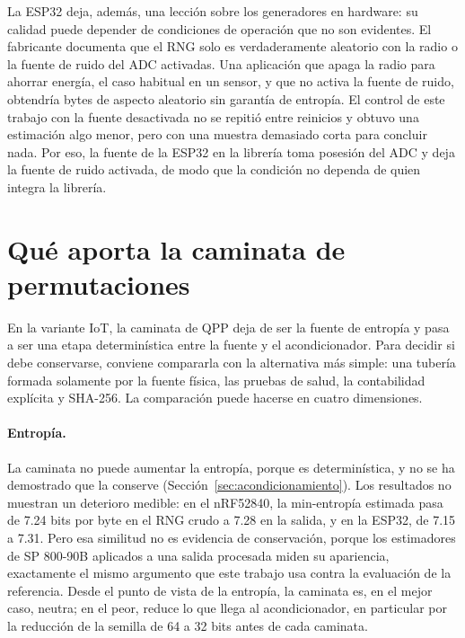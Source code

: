 La ESP32 deja, además, una lección sobre los generadores en hardware: su calidad puede depender de condiciones de operación que no son evidentes. El fabricante documenta que el RNG solo es verdaderamente aleatorio con la radio o la fuente de ruido del ADC activadas. Una aplicación que apaga la radio para ahorrar energía, el caso habitual en un sensor, y que no activa la fuente de ruido, obtendría bytes de aspecto aleatorio sin garantía de entropía. El control de este trabajo con la fuente desactivada no se repitió entre reinicios y obtuvo una estimación algo menor, pero con una muestra demasiado corta para concluir nada. Por eso, la fuente de la ESP32 en la librería toma posesión del ADC y deja la fuente de ruido activada, de modo que la condición no dependa de quien integra la librería.

\section{Qué aporta la caminata de permutaciones}
\label{sec:aporte_caminata}

En la variante IoT, la caminata de QPP deja de ser la fuente de entropía y pasa a ser una etapa determinística entre la fuente y el acondicionador. Para decidir si debe conservarse, conviene compararla con la alternativa más simple: una tubería formada solamente por la fuente física, las pruebas de salud, la contabilidad explícita y SHA-256. La comparación puede hacerse en cuatro dimensiones.

\paragraph{Entropía.} La caminata no puede aumentar la entropía, porque es determinística, y no se ha demostrado que la conserve (Sección~\ref{sec:acondicionamiento}). Los resultados no muestran un deterioro medible: en el nRF52840, la min-entropía estimada pasa de 7.24 bits por byte en el RNG crudo a 7.28 en la salida, y en la ESP32, de 7.15 a 7.31. Pero esa similitud no es evidencia de conservación, porque los estimadores de SP 800-90B aplicados a una salida procesada miden su apariencia, exactamente el mismo argumento que este trabajo usa contra la evaluación de la referencia. Desde el punto de vista de la entropía, la caminata es, en el mejor caso, neutra; en el peor, reduce lo que llega al acondicionador, en particular por la reducción de la semilla de 64 a 32 bits antes de cada caminata.

